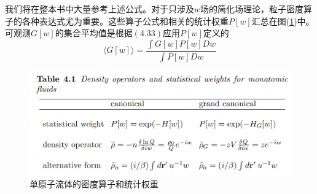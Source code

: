 我们将在整本书中大量参考上述公式。对于只涉及$ w$场的简化场理论，粒子密度算子的各种表达式尤为重要。这些算子公式和相关的统计权重$P[ w ]$汇总在图(\ref{4.1})中。可观测$G[ w]$的集合平均值是根据$(4.33)$应用$P[ w]$定义的\\
\begin{equation}
\langle G[w] \rangle = \frac{\int G[w]P[w]Dw}{\int P[w]Dw}
\end{equation}
\begin{figure}[H]
	\centering   
	\includegraphics[width=12cm]{./figures/1.png}
	\caption{单原子流体的密度算子和统计权重}
	\label{4.1}
\end{figure}

